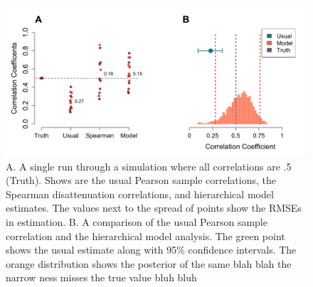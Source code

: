 \documentclass[man, 12pt]{apa7} %
\begin{document}
\begin{figure}[htbp]
    \centering  %
    \includegraphics[width=\linewidth, height=1\linewidth, keepaspectratio]{_figs/prob_setupAll.png}
    \caption{A. A single run through a simulation where all correlations are .5 (Truth).  Shows are the usual Pearson sample correlations, the Spearman disattenuation correlations, and hierarchical model estimates.  The values next to the spread of points show the RMSEs in estimation.  B. A comparison of the usual Pearson sample correlation and the hierarchical model analysis.  The green point shows the usual estimate along with 95\% confidence intervals.  The orange distribution shows the posterior of the same blah blah the narrow ness misses the true value bluh bluh}  %
    \label{fig:prob_setup}
\end{figure}
\end{document}
